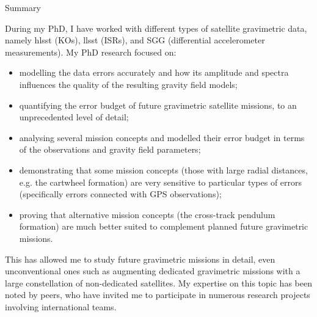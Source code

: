 \begin{cvtext}{Summary}
{%
During my PhD, I have worked with different types of satellite gravimetric data, namely \acl{hlsst} (\aclp{KO}), \acl{llsst} (\aclp{ISR}), and \acl{SGG} (differential accelerometer measurements).
My PhD research focused on:
\begin{itemize}[topsep=0pt,itemsep=1pt,parsep=0pt,partopsep=0pt]
\item modelling the data errors accurately and how its amplitude and spectra influences the quality of the resulting gravity field models;
\item quantifying the error budget of future gravimetric satellite missions, to an unprecedented level of detail;
\item analysing several mission concepts and modelled their error budget in terms of the observations and gravity field parameters;
\item demonstrating that some mission concepts (those with large radial distances, \acs{e.g.} the cartwheel formation) are very sensitive to particular types of errors (specifically errors connected with \ac{GPS} observations); %
\item proving that alternative mission concepts (the cross-track pendulum formation) are much better suited to complement planned future gravimetric missions.%
\end{itemize}
This has allowed me to study future gravimetric missions in detail, even unconventional ones such as augmenting dedicated gravimetric missions with a large constellation of non-dedicated satellites.
My expertise on this topic has been noted by peers, who have invited me to participate in numerous research projects involving international teams.



}
\end{cvtext}
